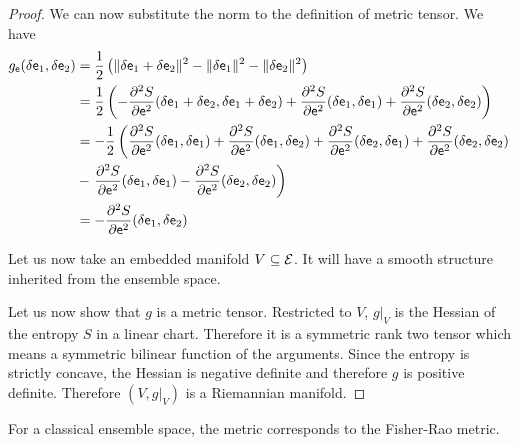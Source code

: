 \begin{proof}
We can now substitute the norm to the definition of metric tensor. We have
\begin{equation}
	\begin{aligned}
		g_{\mathsf{e}}(\delta \mathsf{e}_1, \delta \mathsf{e}_2 ) &= \frac{1}{2} \left( \lVert \delta \mathsf{e}_1 + \delta \mathsf{e}_2 \rVert^2 - \lVert \delta \mathsf{e}_1 \rVert^2 - \lVert \delta \mathsf{e}_2 \rVert^2 \right) \\
		&= \frac{1}{2} \left( - \frac{\partial^2 S}{\partial \mathsf{e}^2} (\delta \mathsf{e}_1 + \delta \mathsf{e}_2, \delta \mathsf{e}_1 + \delta \mathsf{e}_2) + \frac{\partial^2 S}{\partial \mathsf{e}^2} (\delta \mathsf{e}_1, \delta \mathsf{e}_1) + \frac{\partial^2 S}{\partial \mathsf{e}^2} (\delta \mathsf{e}_2, \delta \mathsf{e}_2) \right) \\
		&= - \frac{1}{2} \left(  \frac{\partial^2 S}{\partial \mathsf{e}^2} (\delta \mathsf{e}_1, \delta \mathsf{e}_1) + \frac{\partial^2 S}{\partial \mathsf{e}^2} (\delta \mathsf{e}_1, \delta \mathsf{e}_2) + \frac{\partial^2 S}{\partial \mathsf{e}^2} (\delta \mathsf{e}_2, \delta \mathsf{e}_1) + \frac{\partial^2 S}{\partial \mathsf{e}^2} (\delta \mathsf{e}_2, \delta \mathsf{e}_2) \right. \\
		&-  \left. \frac{\partial^2 S}{\partial \mathsf{e}^2} (\delta \mathsf{e}_1, \delta \mathsf{e}_1) - \frac{\partial^2 S}{\partial \mathsf{e}^2} (\delta \mathsf{e}_2, \delta \mathsf{e}_2) \right) \\
		&= - \frac{\partial^2 S}{\partial \mathsf{e}^2} (\delta \mathsf{e}_1, \delta \mathsf{e}_2) \\
	\end{aligned}
\end{equation}

	Let us now take an embedded manifold $V \subseteq \mathcal{E}$. It will have a smooth structure inherited from the ensemble space.
	
	Let us now show that $g$ is a metric tensor. Restricted to $V$, $g|_V$ is the Hessian of the entropy $S$ in a linear chart. Therefore it is a symmetric rank two tensor which means a symmetric bilinear function of the arguments. Since the entropy is strictly concave, the Hessian is negative definite and therefore $g$ is positive definite. Therefore $(V, g|_V)$ is a Riemannian manifold.
\end{proof}

\begin{prop}
	For a classical ensemble space, the metric corresponds to the Fisher-Rao metric.
\end{prop}

